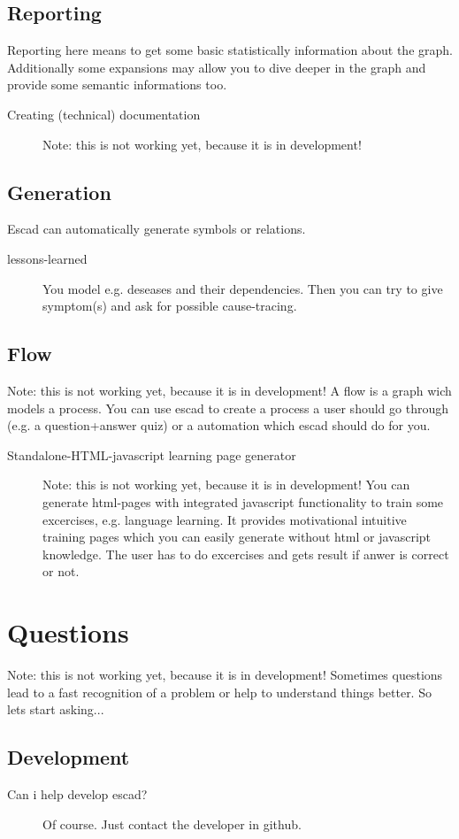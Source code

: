 \documentclass[a4paper, 12pt, openany]{scrbook}
\begin{document}
\subsection{Reporting}
Reporting here means to get some basic statistically information about the graph. Additionally some expansions may allow you to dive deeper in the graph and provide some semantic informations too.
\begin{description}
\item[Creating (technical) documentation]
  Note: this is not working yet, because it is in development!
\end{description}
\subsection{Generation}
Escad can automatically generate symbols or relations.
\begin{description}
\item[lessons-learned] You model e.g. deseases and their dependencies. Then you can try to give symptom(s) and ask for possible cause-tracing.
\end{description}
\subsection{Flow}
Note: this is not working yet, because it is in development!
A flow is a graph wich models a process. You can use escad to create a process a user should go through (e.g. a question+answer quiz) or a automation which escad should do for you.
\begin{description}
\item[Standalone-HTML-javascript learning page generator] Note: this is not working yet, because it is in development! You can generate html-pages with integrated javascript functionality to train some excercises, e.g. language learning. It provides motivational intuitive training pages which you can easily generate without html or javascript knowledge. The user has to do excercises and gets result if anwer is correct or not.
\end{description}
\section{Questions}
Note: this is not working yet, because it is in development!
Sometimes questions lead to a fast recognition of a problem or help to understand things better. So lets start asking...
\subsection{Development}
\begin{description}
\item[Can i help develop escad?] Of course. Just contact the developer in github.
\end{description}
\end{document}
